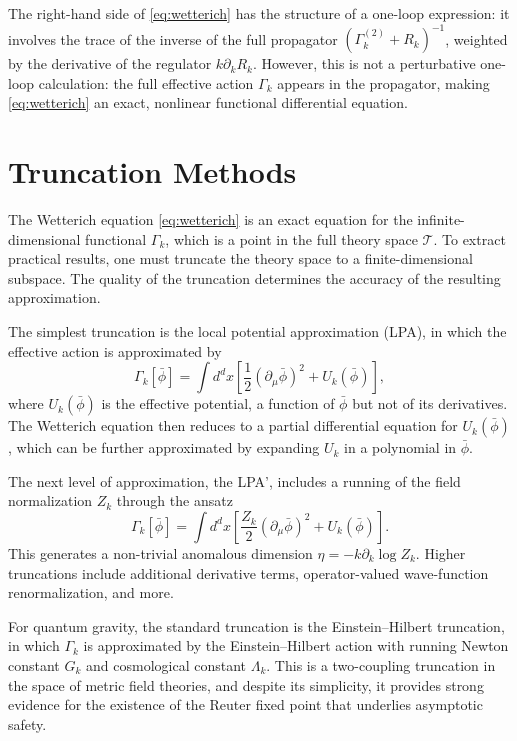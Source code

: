 \documentclass[11pt, twoside, openright]{book}
\theoremstyle{dotted}
\theoremstyle{definition}
\newcommand{\cT}{\mathcal{T}}          %
\newcommand{\Gk}{\Gamma_k}             %
\newcommand{\Gktwo}{\Gamma_k^{(2)}}   %
\newcommand{\Rk}{R_k}                  %
\newcommand{\kdk}{k\partial_k}         %
\begin{document}
The right-hand side of \eqref{eq:wetterich} has the structure of a one-loop
expression: it involves the trace of the inverse of the full propagator
$(\Gktwo + \Rk)^{-1}$, weighted by the derivative of the regulator $\kdk\Rk$.
However, this is not a perturbative one-loop calculation: the full effective action
$\Gk$ appears in the propagator, making \eqref{eq:wetterich} an exact, nonlinear
functional differential equation.

\section{Truncation Methods}

The Wetterich equation \eqref{eq:wetterich} is an exact equation for the infinite-dimensional
functional $\Gk$, which is a point in the full theory space $\cT$. To extract
practical results, one must truncate the theory space to a finite-dimensional
subspace. The quality of the truncation determines the accuracy of the resulting
approximation.

The simplest truncation is the local potential approximation (LPA), in which the
effective action is approximated by
\begin{equation}
  \Gk[\bar\phi] = \int d^dx \left[
    \frac{1}{2}(\partial_\mu\bar\phi)^2 + U_k(\bar\phi)
  \right],
  \label{eq:LPA}
\end{equation}
where $U_k(\bar\phi)$ is the effective potential, a function of $\bar\phi$ but not
of its derivatives. The Wetterich equation then reduces to a partial differential
equation for $U_k(\bar\phi)$, which can be further approximated by expanding
$U_k$ in a polynomial in $\bar\phi$.

The next level of approximation, the LPA', includes a running of the field
normalization $Z_k$ through the ansatz
\begin{equation}
  \Gk[\bar\phi] = \int d^dx \left[
    \frac{Z_k}{2}(\partial_\mu\bar\phi)^2 + U_k(\bar\phi)
  \right].
  \label{eq:LPAprime}
\end{equation}
This generates a non-trivial anomalous dimension $\eta = -\kdk\log Z_k$. Higher
truncations include additional derivative terms, operator-valued wave-function
renormalization, and more.

For quantum gravity, the standard truncation is the Einstein--Hilbert truncation,
in which $\Gk$ is approximated by the Einstein--Hilbert action with running Newton
constant $G_k$ and cosmological constant $\Lambda_k$. This is a two-coupling
truncation in the space of metric field theories, and despite its simplicity, it
provides strong evidence for the existence of the Reuter fixed point that underlies
asymptotic safety.
\end{document}
